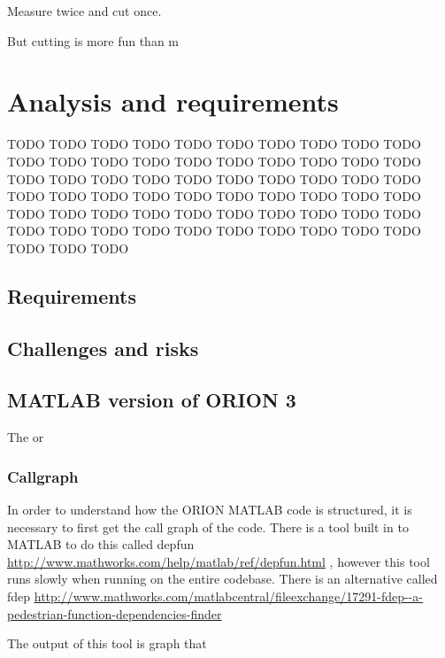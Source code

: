 \begin{savequote}[0.55\linewidth]
	\begin{fancyquote}
		Measure twice and cut once.
	\end{fancyquote}

	\begin{fancyquote}
		But cut\hspace{1em}ting is more fun than m\hspace{0.5em}\raisebox{-0.1em}{eas}\hspace{0.5em}\raisebox{-0.3em}{uri}\hspace{0.5em}\raisebox{-0.5em}{ng!}
	\end{fancyquote}
\end{savequote}

\chapter{Analysis and requirements}\label{ch:analysis}

TODO TODO TODO
TODO TODO TODO
TODO TODO TODO
TODO TODO TODO
TODO TODO TODO
TODO TODO TODO
TODO TODO TODO
TODO TODO TODO
TODO TODO TODO
TODO TODO TODO
TODO TODO TODO
TODO TODO TODO
TODO TODO TODO
TODO TODO TODO
TODO TODO TODO
TODO TODO TODO
TODO TODO TODO
TODO TODO TODO
TODO TODO TODO
TODO TODO TODO
TODO TODO TODO

\section{Requirements}

\section{Challenges and risks}

\section{MATLAB version of ORION 3}

The or

\subsection{Callgraph}

In order to understand how the ORION MATLAB code is structured, it
is necessary to first get the call graph of the code. There is a
tool built in to MATLAB to do this called
depfun
\url{http://www.mathworks.com/help/matlab/ref/depfun.html} %
, however this tool runs slowly when running on the entire codebase.
There is an alternative called fdep
\url{http://www.mathworks.com/matlabcentral/fileexchange/17291-fdep--a-pedestrian-function-dependencies-finder}

The output of this tool is graph that %


